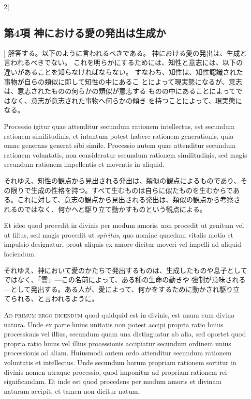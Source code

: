 \documentclass[paper=a4paper,fontsize=10pt,jafontsize=9pt,titlepage]{jlreq}
\begin{document}
\begin{paracol}{2}[\subsection{第4項 神における愛の発出は生成か}]
解答する。以下のように言われるべきである。
神における愛の発出は、生成と言われるべきでない。
これを明らかにするためには、知性と意志には、以下の違いがあることを知らなければならない。
すなわち、知性は、知性認識された事物が自らの類似に即して知性の中にあるこ
 とによって現実態になるが、意志は、意志されたものの何らかの類似が意志する
 ものの中にあることによってではなく、意志が意志された事物へ何らかの傾き
 を持つことによって、現実態になる。


\switchcolumn*


Processio igitur quae attenditur secundum rationem
 intellectus, est secundum rationem similitudinis, et intantum potest
 habere rationem generationis, quia omne generans generat sibi
 simile. Processio autem quae attenditur secundum rationem voluntatis,
 non consideratur secundum rationem similitudinis, sed magis secundum
 rationem impellentis et moventis in aliquid.


\switchcolumn


それゆえ、知性の観点から見出される発出は、類似の観点によるものであり、そ
 の限りで生成の性格を持つ。すべて生むものは自らに似たものを生むからであ
 る。これに対して、意志の観点から見出される発出は、類似の観点から考察さ
 れるのではなく、何かへと駆り立て動かすものという観点による。


\switchcolumn*


Et ideo quod procedit in
 divinis per modum amoris, non procedit ut genitum vel ut filius, sed
 magis procedit ut {\itshape spiritus}, quo nomine quaedam vitalis motio et
 impulsio designatur, prout aliquis ex amore dicitur moveri vel impelli
 ad aliquid faciendum.


\switchcolumn


それゆえ、神において愛のかたちで発出するものは、生成したものや息子として
 ではなく、「霊」---この名前によって、ある種の生命の動きや
 強制が意味される---として発出する。ある人が、愛によって、何かをするために動かされ駆り立
 てられる、と言われるように。


\switchcolumn*[\subsection{ad.1}]


{\scshape Ad primum ergo dicendum} quod quidquid est in divinis, est
 unum cum divina natura. Unde ex parte huius unitatis non potest accipi
 propria ratio huius processionis vel illius, secundum quam una
 distinguatur ab alia, sed oportet quod propria ratio huius vel illius
 processionis accipiatur secundum ordinem unius processionis ad
 aliam. Huiusmodi autem ordo attenditur secundum rationem voluntatis et
 intellectus. Unde secundum horum propriam rationem sortitur in divinis
 nomen utraque processio, quod imponitur ad propriam rationem rei
 significandam. Et inde est quod procedens per modum amoris et divinam
 naturam accipit, et tamen non dicitur natum.



\end{paracol}
\end{document}
